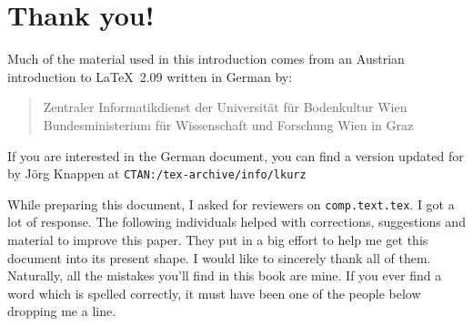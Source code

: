 ﻿%
\chapter{Thank you!}
\noindent Much of the material used in this introduction comes from an
Austrian introduction to \LaTeX\ 2.09 written in German by:
\begin{verse}
%
{Zentraler Informatikdienst der Universit\"at f\"ur Bodenkultur Wien}
%
   {Bundesministerium f\"ur Wissenschaft und Forschung Wien}
%
   {in Graz}
\end{verse}

If you are interested in the German document, you can find a version
updated for \LaTeXe{} by J\"org Knappen at
\texttt{CTAN:/tex-archive/info/lkurz}

\noindent While preparing this document, I asked
for reviewers on \texttt{comp.text.tex}. I got a lot of response. The
following individuals helped with corrections, suggestions and
material to improve this paper. They put in a big effort to help me
get this document into its present shape. I would like to
sincerely thank all of them. Naturally, all the mistakes you'll find
in this book are mine. If you ever find a word which is spelled
correctly, it must have been one of the people below dropping me a
line.



